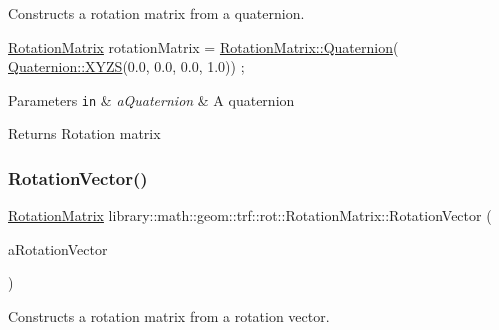 Constructs a rotation matrix from a quaternion. 


\begin{DoxyCode}
\hyperlink{classlibrary_1_1math_1_1geom_1_1trf_1_1rot_1_1_rotation_matrix_a667d2c05aa5b0cc88775938d11164cdc}{RotationMatrix} rotationMatrix = \hyperlink{classlibrary_1_1math_1_1geom_1_1trf_1_1rot_1_1_rotation_matrix_aba9c64b7b25d9819358c0caba6c388e2}{RotationMatrix::Quaternion}(
      \hyperlink{classlibrary_1_1math_1_1geom_1_1trf_1_1rot_1_1_quaternion_afff9523c7dcbfbbc521736121e62ad41}{Quaternion::XYZS}(0.0, 0.0, 0.0, 1.0)) ;
\end{DoxyCode}



\begin{DoxyParams}[1]{Parameters}
\mbox{\tt in}  & {\em a\+Quaternion} & A quaternion \\
\hline
\end{DoxyParams}
\begin{DoxyReturn}{Returns}
Rotation matrix 
\end{DoxyReturn}
\mbox{\label{classlibrary_1_1math_1_1geom_1_1trf_1_1rot_1_1_rotation_matrix_aeace0bbd2b718443514a5f10aca3a904}} 
\subsubsection{\texorpdfstring{Rotation\+Vector()}{RotationVector()}}
{\footnotesize\ttfamily \hyperlink{classlibrary_1_1math_1_1geom_1_1trf_1_1rot_1_1_rotation_matrix}{Rotation\+Matrix} library\+::math\+::geom\+::trf\+::rot\+::\+Rotation\+Matrix\+::\+Rotation\+Vector (\begin{DoxyParamCaption}\item[{const \hyperlink{classlibrary_1_1math_1_1geom_1_1trf_1_1rot_1_1_rotation_vector}{rot\+::\+Rotation\+Vector} \&}]{a\+Rotation\+Vector }\end{DoxyParamCaption})\hspace{0.3cm}{\ttfamily [static]}}



Constructs a rotation matrix from a rotation vector. 


